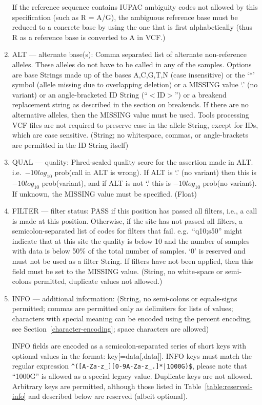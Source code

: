 \documentclass[8pt]{article}
\begin{document}
\begin{enumerate}
  If the reference sequence contains IUPAC ambiguity codes not allowed by this specification (such as R = A/G), the ambiguous reference base must be reduced to a concrete base by using the one that is first alphabetically (thus R as a reference base is converted to A in VCF.)

  \item ALT --- alternate base(s): Comma separated list of alternate non-reference alleles.
  These alleles do not have to be called in any of the samples.
  Options are base Strings made up of the bases A,C,G,T,N (case insensitive) or the `*' symbol (allele missing due to overlapping deletion) or a MISSING value `.' (no variant) or an angle-bracketed ID String (``$<$ID$>$'') or a breakend replacement string as described in the section on breakends.
  If there are no alternative alleles, then the MISSING value must be used.
  Tools processing VCF files are not required to preserve case in the allele String, except for IDs, which are case sensitive.
  (String; no whitespace, commas, or angle-brackets are permitted in the ID String itself)
  \item QUAL --- quality: Phred-scaled quality score for the assertion made in ALT. i.e.\ $-10log_{10}$ prob(call in ALT is wrong).
  If ALT is `.' (no variant) then this is $-10log_{10}$ prob(variant), and if ALT is not `.' this is $-10log_{10}$ prob(no variant).
  If unknown, the MISSING value must be specified. (Float)
  \item FILTER --- filter status: PASS if this position has passed all filters, i.e., a call is made at this position.
  Otherwise, if the site has not passed all filters, a semicolon-separated list of codes for filters that fail. e.g.\ ``q10;s50'' might indicate that at this site the quality is below 10 and the number of samples with data is below 50\% of the total number of samples.
  `0' is reserved and must not be used as a filter String.
  If filters have not been applied, then this field must be set to the MISSING value.
  (String, no white-space or semi-colons permitted, duplicate values not allowed.)
  \item INFO --- additional information: (String, no semi-colons or equals-signs permitted; commas are permitted only as delimiters for lists of values; characters with special meaning can be encoded using the percent encoding, see Section~\ref{character-encoding}; space characters are allowed)

  INFO fields are encoded as a semicolon-separated series of short keys with optional values in the format: key[=data[,data]].
  INFO keys must match the regular expression \texttt{\^{}([A-Za-z\_][0-9A-Za-z\_.]*|1000G)\$}, please note that ``1000G'' is allowed as a special legacy value.
  Duplicate keys are not allowed.
  Arbitrary keys are permitted, although those listed in Table~\ref{table:reserved-info} and described below are reserved (albeit optional).


\end{enumerate}
\end{document}
